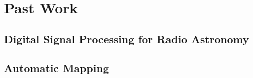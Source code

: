 \chapter{Past Work}

\section{Digital Signal Processing for Radio Astronomy}


\section{Automatic Mapping}

